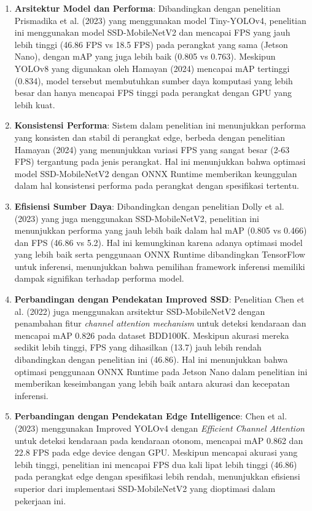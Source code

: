 \begin{enumerate}[nolistsep]
    \item \textbf{Arsitektur Model dan Performa}: Dibandingkan dengan penelitian Prismadika et al. (2023) yang menggunakan model Tiny-YOLOv4, penelitian ini menggunakan model SSD-MobileNetV2 dan mencapai FPS yang jauh lebih tinggi (46.86 FPS vs 18.5 FPS) pada perangkat yang sama (Jetson Nano), dengan mAP yang juga lebih baik (0.805 vs 0.763). Meskipun YOLOv8 yang digunakan oleh Hamayan (2024) mencapai mAP tertinggi (0.834), model tersebut membutuhkan sumber daya komputasi yang lebih besar dan hanya mencapai FPS tinggi pada perangkat dengan GPU yang lebih kuat.
    \item \textbf{Konsistensi Performa}: Sistem dalam penelitian ini menunjukkan performa yang konsisten dan stabil di perangkat edge, berbeda dengan penelitian Hamayan (2024) yang menunjukkan variasi FPS yang sangat besar (2-63 FPS) tergantung pada jenis perangkat. Hal ini menunjukkan bahwa optimasi model SSD-MobileNetV2 dengan ONNX Runtime memberikan keunggulan dalam hal konsistensi performa pada perangkat dengan spesifikasi tertentu.
    \item \textbf{Efisiensi Sumber Daya}: Dibandingkan dengan penelitian Dolly et al. (2023) yang juga menggunakan SSD-MobileNetV2, penelitian ini menunjukkan performa yang jauh lebih baik dalam hal mAP (0.805 vs 0.466) dan FPS (46.86 vs 5.2). Hal ini kemungkinan karena adanya optimasi model yang lebih baik serta penggunaan ONNX Runtime dibandingkan TensorFlow untuk inferensi, menunjukkan bahwa pemilihan framework inferensi memiliki dampak signifikan terhadap performa model.
    \item \textbf{Perbandingan dengan Pendekatan Improved SSD}: Penelitian Chen et al. (2022) juga menggunakan arsitektur SSD-MobileNetV2 dengan penambahan fitur \emph{channel attention mechanism} untuk deteksi kendaraan dan mencapai mAP 0.826 pada dataset BDD100K. Meskipun akurasi mereka sedikit lebih tinggi, FPS yang dihasilkan (13.7) jauh lebih rendah dibandingkan dengan penelitian ini (46.86). Hal ini menunjukkan bahwa optimasi penggunaan ONNX Runtime pada Jetson Nano dalam penelitian ini memberikan keseimbangan yang lebih baik antara akurasi dan kecepatan inferensi.
    \item \textbf{Perbandingan dengan Pendekatan Edge Intelligence}: Chen et al. (2023) menggunakan Improved YOLOv4 dengan \emph{Efficient Channel Attention} untuk deteksi kendaraan pada kendaraan otonom, mencapai mAP 0.862 dan 22.8 FPS pada edge device dengan GPU. Meskipun mencapai akurasi yang lebih tinggi, penelitian ini mencapai FPS dua kali lipat lebih tinggi (46.86) pada perangkat edge dengan spesifikasi lebih rendah, menunjukkan efisiensi superior dari implementasi SSD-MobileNetV2 yang dioptimasi dalam pekerjaan ini.

\end{enumerate}
